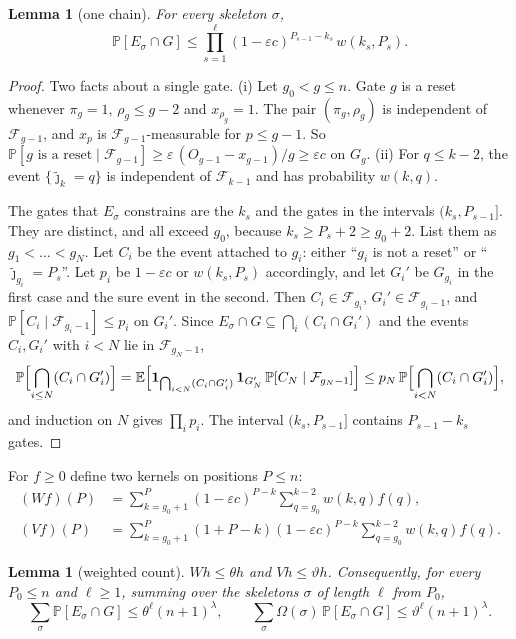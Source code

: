 \documentclass[11pt]{amsart}
\newtheorem{lemma}[theorem]{Lemma}
\theoremstyle{definition}
\theoremstyle{remark}
\newcommand{\eps}{\varepsilon}
\newcommand{\jt}{\tilde{\jmath}}
\newcommand{\PP}{\mathbb{P}}
\newcommand{\EE}{\mathbb{E}}
\newcommand{\cF}{\mathcal{F}}
\begin{document}
\begin{lemma}[one chain]\label{lem:onechain}
For every skeleton $\sigma$,
\[
\PP[E_\sigma\cap G]\le\prod_{s=1}^{\ell}(1-\eps c)^{P_{s-1}-k_s}\,w(k_s,P_s).
\]
\end{lemma}

\begin{proof}
Two facts about a single gate. (i) Let $g_0<g\le n$. Gate $g$ is a reset whenever $\pi_g=1$,
$\rho_g\le g-2$ and $x_{\rho_g}=1$. The pair $(\pi_g,\rho_g)$ is independent of $\cF_{g-1}$, and
$x_p$ is $\cF_{g-1}$-measurable for $p\le g-1$. So
$\PP[g\text{ is a reset}\mid\cF_{g-1}]\ge \eps\,(O_{g-1}-x_{g-1})/g\ge\eps c$ on $G_g$.
(ii) For $q\le k-2$, the event $\{\jt_k=q\}$ is independent of $\cF_{k-1}$ and has probability
$w(k,q)$.

The gates that $E_\sigma$ constrains are the $k_s$ and the gates in the intervals $(k_s,P_{s-1}]$.
They are distinct, and all exceed $g_0$, because $k_s\ge P_s+2\ge g_0+2$. List them as
$g_1<\dots<g_N$. Let $C_i$ be the event attached to $g_i$: either ``$g_i$ is not a reset'' or
``$\jt_{g_i}=P_s$''. Let $p_i$ be $1-\eps c$ or $w(k_s,P_s)$ accordingly, and let $G_i'$ be
$G_{g_i}$ in the first case and the sure event in the second. Then $C_i\in\cF_{g_i}$,
$G_i'\in\cF_{g_i-1}$, and $\PP[C_i\mid\cF_{g_i-1}]\le p_i$ on $G_i'$. Since
$E_\sigma\cap G\subseteq\bigcap_i(C_i\cap G_i')$ and the events $C_i,G_i'$ with $i<N$ lie in
$\cF_{g_N-1}$,
\[
\PP\Bigl[\bigcap_{i\le N}(C_i\cap G_i')\Bigr]
=\EE\Bigl[\mathbf 1_{\bigcap_{i<N}(C_i\cap G_i')}\,\mathbf 1_{G_N'}\,\PP[C_N\mid\cF_{g_N-1}]\Bigr]
\le p_N\,\PP\Bigl[\bigcap_{i<N}(C_i\cap G_i')\Bigr],
\]
and induction on $N$ gives $\prod_i p_i$. The interval $(k_s,P_{s-1}]$ contains $P_{s-1}-k_s$ gates.
\end{proof}

For $f\ge0$ define two kernels on positions $P\le n$:
\begin{align*}
(Wf)(P)&=\sum_{k=g_0+1}^{P}(1-\eps c)^{P-k}\sum_{q=g_0}^{k-2}w(k,q)f(q),\\
(Vf)(P)&=\sum_{k=g_0+1}^{P}(1+P-k)(1-\eps c)^{P-k}\sum_{q=g_0}^{k-2}w(k,q)f(q).
\end{align*}

\begin{lemma}[weighted count]\label{lem:kernel}
$Wh\le\theta h$ and $Vh\le\vartheta h$. Consequently, for every $P_0\le n$ and $\ell\ge1$, summing
over the skeletons $\sigma$ of length $\ell$ from $P_0$,
\[
\sum_\sigma\PP[E_\sigma\cap G]\le\theta^\ell(n+1)^\lambda,\qquad
\sum_\sigma\Omega(\sigma)\,\PP[E_\sigma\cap G]\le\vartheta^\ell(n+1)^\lambda .
\]
\end{lemma}
\end{document}
